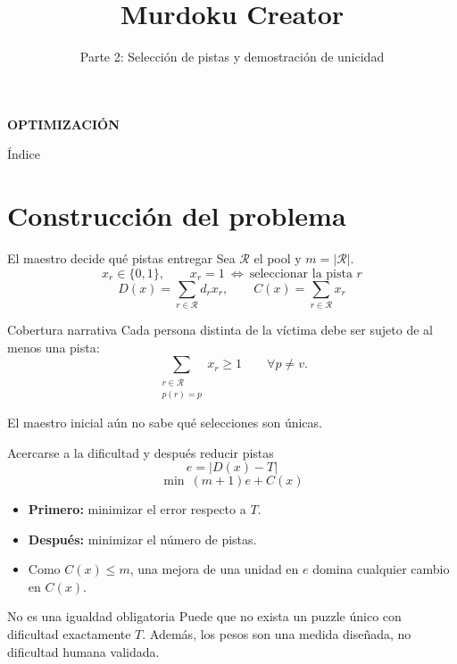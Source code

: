\documentclass[aspectratio=169,11pt]{beamer}
\title{Murdoku Creator}
\subtitle{Parte 2: Selecci\'on de pistas y demostraci\'on de unicidad}
\date{}
\begin{document}
\begin{frame}[plain]
  \vspace{8mm}
  {\small\color{teal}\bfseries OPTIMIZACIÓN}
  \vspace{4mm}
  \titlepage

\end{frame}

\begin{frame}{\'Indice}
  \small
  \tableofcontents[sectionstyle=show/show,subsectionstyle=show/show/show]
\end{frame}

\section{Construcci\'on del problema}

\begin{frame}{El maestro decide qu\'e pistas entregar}
  Sea \(\mathcal R\) el pool y \(m=|\mathcal R|\).
  \[
    x_r\in\{0,1\},\qquad
    x_r=1\ \Longleftrightarrow\ \text{seleccionar la pista }r
  \]
  \[
    D(x)=\sum_{r\in\mathcal R}d_rx_r,\qquad
    C(x)=\sum_{r\in\mathcal R}x_r
  \]
  \begin{block}{Cobertura narrativa}
    Cada persona distinta de la v\'ictima debe ser sujeto de al menos una pista:
    \[
      \sum_{\substack{r\in\mathcal R\\p(r)=p}}x_r\geq1
      \qquad \forall p\neq v.
    \]
  \end{block}
  \small El maestro inicial a\'un no sabe qu\'e selecciones son \'unicas.
\end{frame}

\begin{frame}{Acercarse a la dificultad y despu\'es reducir pistas}
  \[
    e=|D(x)-T|
  \]
  \[
    \boxed{\min\ (m+1)e+C(x)}
  \]
  \begin{itemize}
    \setlength{\itemsep}{3mm}
    \item \textbf{Primero:} minimizar el error respecto a \(T\).
    \item \textbf{Despu\'es:} minimizar el n\'umero de pistas.
    \item Como \(C(x)\leq m\), una mejora de una unidad en \(e\)
      domina cualquier cambio en \(C(x)\).
  \end{itemize}
  \begin{alertblock}{No es una igualdad obligatoria}
    Puede que no exista un puzzle \'unico con dificultad exactamente \(T\).
    Adem\'as, los pesos son una medida dise\~nada, no dificultad humana validada.
  \end{alertblock}
\end{frame}
\end{document}
